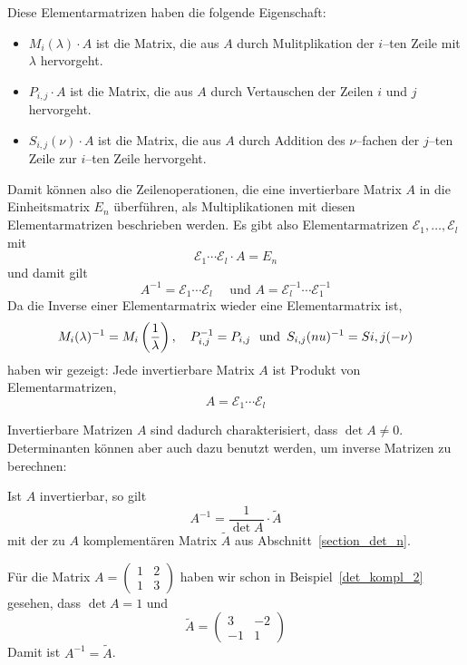 \begin{notiz}\label{det_inverse_elementar} 
Diese Elementarmatrizen haben die folgende Eigenschaft:

\begin{itemize}
\item $M_i(\lambda) \cdot A$ ist die Matrix, die aus $A$ durch Mulitplikation der 
$i$--ten Zeile mit $\lambda$ hervorgeht.
\item $P_{i,j} \cdot A$ ist die Matrix, die aus $A$ durch Vertauschen der Zeilen $i$ 
und $j$ hervorgeht.
\item $S_{i,j}(\nu) \cdot A$ ist die Matrix, die aus $A$ durch Addition des 
$\nu$--fachen der $j$--ten Zeile zur $i$--ten Zeile hervorgeht. 
\end{itemize}

Damit können also die Zeilenoperationen, die eine invertierbare Matrix $A$ in die 
Einheitsmatrix $E_n$ überführen, als Multiplikationen mit diesen 
Elementarmatrizen beschrieben werden. Es gibt also Elementarmatrizen 
$\mathcal{E}_1, \ldots, \mathcal{E}_l$ mit 
  	$$ \mathcal{E}_1 \cdots \mathcal{E}_l \cdot A = E_n $$
und damit gilt 
  	$$ A^{-1} = \mathcal{E}_1 \cdots \mathcal{E}_l \quad \textrm{ und } 
  A = \mathcal{E}_l^{-1} \cdots \mathcal{E}_1^{-1} $$
Da die Inverse einer Elementarmatrix wieder eine Elementarmatrix ist, 
	$$ M_i(\lambda)^{-1} = M_i\left(\frac{1}{\lambda}\right), \quad P_{i,j}^{-1}=P_{i,j} \,\, \text{ und } \, 
	S_{i,j}(\\nu)^{-1} = S{i,j}(-\nu) $$ 
haben wir gezeigt:  Jede invertierbare Matrix $A$ ist Produkt von Elementarmatrizen, 
  	$$ A = \mathcal{E}_1 \cdots \mathcal{E}_l $$
\end{notiz}

\bigbreak

Invertierbare Matrizen $A$  sind dadurch charakterisiert, dass $\det{A} \neq 0$. 
Determinanten können aber auch dazu benutzt werden, um inverse Matrizen zu berechnen:

\begin{satz}\label{det_inverse_komplement} Ist $A$ invertierbar, so gilt
  	$$ A^{-1} = \frac {1}{\det{A}} \cdot  \widetilde{A} $$
mit der zu $A$ komplementären Matrix $\widetilde{A}$ aus 
Abschnitt~\ref{section_det_n}.
\end{satz}


\begin{beispiel} Für die Matrix 
  	$ A = \left( \begin{matrix} 1 & 2 \\ 1 & 3 \end{matrix} \right) $
haben wir schon in Beispiel~\ref{det_kompl_2} gesehen, dass $\det{A} = 1$ und  
  	$$ \widetilde{A} = \left( \begin{matrix} 3 & -2 \\ -1 & 1 \end{matrix} \right) $$
Damit ist $A^{-1} = \widetilde{A}$.
\end{beispiel}

